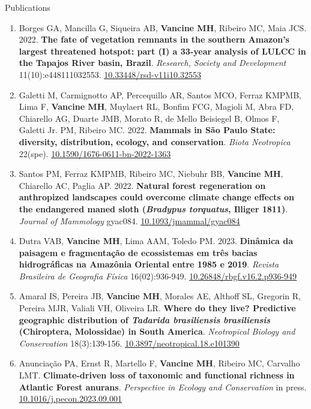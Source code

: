 \documentclass{resume}
\begin{document}
\begin{rSection}{Publications}
\begin{enumerate}
\item Borges GA, Mancilla G, Siqueira AB, {\bf Vancine MH}, Ribeiro MC, Maia JCS. 2022. {\bf The fate of vegetation remnants in the southern Amazon’s largest threatened hotspot: part (I) a 33-year analysis of LULCC in the Tapajos River basin, Brazil}. {\it Research, Society and Development} 11(10):e448111032553. \href{https://doi.org/10.33448/rsd-v11i10.32553}{\underline{10.33448/rsd-v11i10.32553}}

\item Galetti M, Carmignotto AP, Percequillo AR, Santos MCO, Ferraz KMPMB, Lima F, {\bf Vancine MH}, Muylaert RL, Bonfim FCG, Magioli M, Abra FD, Chiarello AG, Duarte JMB, Morato R, de Mello Beisiegel B, Olmos F, Galetti Jr. PM, Ribeiro MC. 2022. {\bf Mammals in São Paulo State: diversity, distribution, ecology, and conservation}. {\it Biota Neotropica} 22(spe). \href{https://doi.org/10.1590/1676-0611-bn-2022-1363}{\underline{10.1590/1676-0611-bn-2022-1363}}

\item Santos PM, Ferraz KMPMB, Ribeiro MC, Niebuhr BB, {\bf Vancine MH}, Chiarello AC, Paglia AP. 2022. {\bf Natural forest regeneration on anthropized landscapes could overcome climate change effects on the endangered maned sloth ({\it Bradypus torquatus}, Illiger 1811)}. {\it Journal of Mammology} gyac084. \href{https://doi.org/10.1093/jmammal/gyac084}{\underline{10.1093/jmammal/gyac084}}

\item Dutra VAB, {\bf Vancine MH}, Lima AAM, Toledo PM. 2023. {\bf Dinâmica da paisagem e fragmentação de ecossistemas em três bacias hidrográficas na Amazônia Oriental entre 1985 e 2019}. {\it Revista Brasileira de Geografia Física} 16(02):936-949. \href{https://doi.org/10.26848/rbgf.v16.2.p936-949}{\underline{10.26848/rbgf.v16.2.p936-949}}

\item Amaral IS, Pereira JB, {\bf Vancine MH}, Morales AE, Althoff SL, Gregorin R, Pereira MJR, Valiali VH, Oliveira LR. {\bf Where do they live? Predictive geographic distribution of {\it Tadarida brasiliensis brasiliensis} (Chiroptera, Molossidae) in South America}. {\it Neotropical Biology and Conservation} 18(3):139-156. \href{https://doi.org/10.3897/neotropical.18.e101390}{\underline{10.3897/neotropical.18.e101390}}

\item Anunciação PA, Ernst R, Martello F, {\bf Vancine MH}, Ribeiro MC, Carvalho LMT. {\bf Climate-driven loss of taxonomic and functional richness in Atlantic Forest anurans}. {\it Perspective in Ecology and Conservation} in press. \href{https://doi.org/10.1016/j.pecon.2023.09.001}{\underline{10.1016/j.pecon.2023.09.001}}


\end{enumerate}
\end{rSection}
\end{document}
